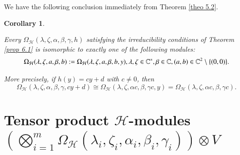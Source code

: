 \documentclass[12pt,reqno]{amsart}
\numberwithin{equation}{section}
\newtheorem{coro}[theo]{Corollary}
\begin{document}
We have the following conclusion immediately from Theorem \ref{theo 5.2}.

\begin{coro}\label{coro 6.5}

Every $\Omega_{\mathcal{H}}(\lambda,\zeta,\alpha,\beta,\gamma,h)$ satisfying the irreducibility conditions of Theorem \ref{prop 6.1} is isomorphic to exactly one of the following modules:
\begin{equation*}\label{formula 6.5.1}
\aligned
\Omega_{\mathcal{H}}(\lambda,\zeta,a,\beta,b):=\Omega_{\mathcal{H}}(\lambda,\zeta,a,\beta,b,y),
\lambda,\zeta\in\mathbb C^*,
\beta\in\mathbb C,
(a,b)\in\mathbb C^2\setminus\{(0,0)\}.
\endaligned
\end{equation*}

More precisely, if $h(y)=cy+d$ with $c\ne0$, then
$$\Omega_{\mathcal{H}}(\lambda,\zeta,\alpha,\beta,\gamma,cy+d)
\cong
\Omega_{\mathcal{H}}(\lambda,\zeta,\alpha c,\beta,\gamma c,y)=\Omega_{\mathcal{H}}(\lambda,\zeta,\alpha c,\beta,\gamma c).$$
\end{coro}

































\section{\texorpdfstring{ Tensor product $\mathcal{H}$-modules $\left(\bigotimes_{i=1}^{m}\Omega_{\mathcal{H}}(\lambda_i,\zeta_i, \alpha_i,\beta_i,\gamma_i)\right)\otimes V$}{Tensor product modules}}\label{section 6}

\end{document}
